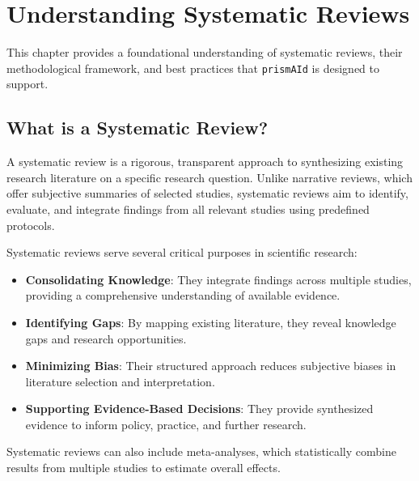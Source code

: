 \chapter{Understanding Systematic Reviews} \label{chap:sysrev}

This chapter provides a foundational understanding of systematic reviews, their methodological framework, and best practices that \texttt{prismAId} is designed to support.

\section{What is a Systematic Review?}

A systematic review is a rigorous, transparent approach to synthesizing existing research literature on a specific research question. Unlike narrative reviews, which offer subjective summaries of selected studies, systematic reviews aim to identify, evaluate, and integrate findings from all relevant studies using predefined protocols.

Systematic reviews serve several critical purposes in scientific research:

\begin{itemize}
    \item \textbf{Consolidating Knowledge}: They integrate findings across multiple studies, providing a comprehensive understanding of available evidence.
    \item \textbf{Identifying Gaps}: By mapping existing literature, they reveal knowledge gaps and research opportunities.
    \item \textbf{Minimizing Bias}: Their structured approach reduces subjective biases in literature selection and interpretation.
    \item \textbf{Supporting Evidence-Based Decisions}: They provide synthesized evidence to inform policy, practice, and further research.
\end{itemize}


Systematic reviews can also include meta-analyses, which statistically combine results from multiple studies to estimate overall effects.

